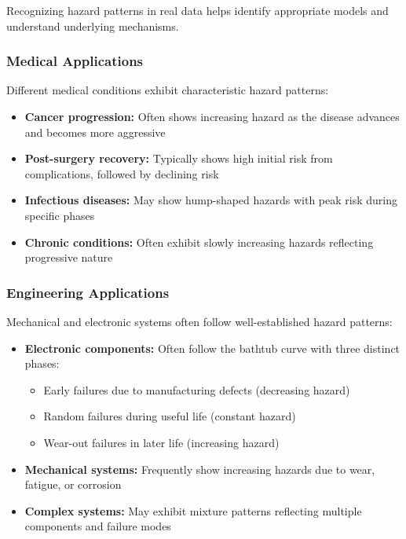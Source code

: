 Recognizing hazard patterns in real data helps identify appropriate models and understand underlying mechanisms.

\subsubsection{Medical Applications}

Different medical conditions exhibit characteristic hazard patterns:
\begin{itemize}
    \item \textbf{Cancer progression:} Often shows increasing hazard as the disease advances and becomes more aggressive
    \item \textbf{Post-surgery recovery:} Typically shows high initial risk from complications, followed by declining risk
    \item \textbf{Infectious diseases:} May show hump-shaped hazards with peak risk during specific phases
    \item \textbf{Chronic conditions:} Often exhibit slowly increasing hazards reflecting progressive nature
\end{itemize}

\subsubsection{Engineering Applications}

Mechanical and electronic systems often follow well-established hazard patterns:
\begin{itemize}
    \item \textbf{Electronic components:} Often follow the bathtub curve with three distinct phases:
    \begin{itemize}
        \item Early failures due to manufacturing defects (decreasing hazard)
        \item Random failures during useful life (constant hazard)
        \item Wear-out failures in later life (increasing hazard)
    \end{itemize}
    \item \textbf{Mechanical systems:} Frequently show increasing hazards due to wear, fatigue, or corrosion
    \item \textbf{Complex systems:} May exhibit mixture patterns reflecting multiple components and failure modes
\end{itemize}

